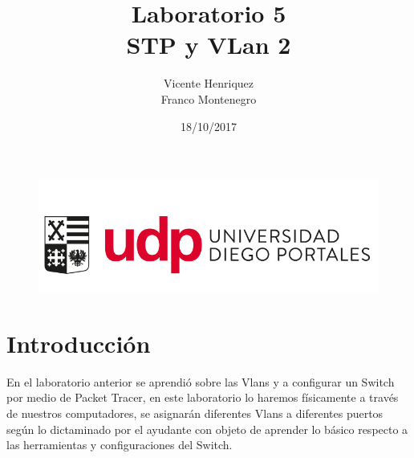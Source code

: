 \documentclass{article}
\begin{document}
\begin{figure}[t!]
\includegraphics[scale=0.3]{logo_udp.PNG}
\label{fig:udplogo}
\end{figure}

\title{\textbf{{Laboratorio 5 \\ STP y VLan 2\vspace{10cm}}}}
\author{\hspace{8cm} Vicente Henriquez \\ \hspace{8cm} Franco Montenegro}
\date{\hspace{8cm} 18/10/2017}

\maketitle
\newpage
\tableofcontents
\newpage
\section{Introducción\vspace{0.5cm}}
En el laboratorio anterior se aprendió sobre las Vlans y a configurar un Switch por medio de Packet Tracer, en este laboratorio lo haremos físicamente a través de nuestros computadores, se asignarán diferentes Vlans a diferentes puertos según lo dictaminado por el ayudante con objeto de aprender lo básico respecto a las herramientas y configuraciones del Switch.
\newpage
\end{document}
